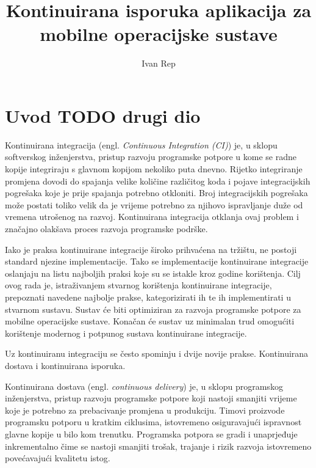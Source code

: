 \documentclass[times, utf8, seminar, numeric]{fer}
\newcommand{\eng}[1]{(engl. \textit{#1})}
\begin{document}
\nocite{*}

\title{Kontinuirana isporuka aplikacija za mobilne operacijske sustave}

\author{Ivan Rep}


\maketitle

\tableofcontents

\chapter{Uvod TODO drugi dio}
Kontinuirana integracija \eng{Continuous Integration (CI)} je, u sklopu softverskog inženjerstva, pristup razvoju programske potpore u kome se radne kopije integriraju s glavnom kopijom nekoliko puta dnevno. Rijetko integriranje promjena dovodi do spajanja velike količine različitog koda i pojave integracijskih pogrešaka koje je prije spajanja potrebno otkloniti. Broj integracijskih pogrešaka može postati toliko velik da je vrijeme potrebno za njihovo ispravljanje duže od vremena utrošenog na razvoj. Kontinuirana integracija otklanja ovaj problem i značajno olakšava proces razvoja programske podrške\citep{wiki:CI}.

Iako je praksa kontinuirane integracije široko prihvaćena na tržištu, ne postoji standard njezine implementacije. Tako se implementacije kontinuirane integracije oslanjaju na listu najboljih praksi koje su se istakle kroz godine korištenja. Cilj ovog rada je, istraživanjem stvarnog korištenja kontinuirane integracije, prepoznati navedene najbolje prakse, kategorizirati ih te ih implementirati u stvarnom sustavu. Sustav će biti optimiziran za razvoja programske potpore za mobilne operacijske sustave. Konačan će sustav uz minimalan trud omogućiti korištenje modernog i potpunog sustava kontinuirane integracije.

Uz kontinuiranu integraciju se često spominju i dvije novije prakse. Kontinuirana dostava i kontinuirana isporuka.

Kontinuirana dostava \eng{continuous delivery} je, u sklopu programskog inženjerstva, pristup razvoju programske potpore koji nastoji smanjiti vrijeme koje je potrebno za prebacivanje promjena u produkciju. Timovi proizvode programsku potporu u kratkim ciklusima, istovremeno osiguravajući ispravnost glavne kopije u bilo kom trenutku. Programska potpora se gradi i unaprjeđuje inkrementalno čime se nastoji smanjiti trošak, trajanje i rizik razvoja istovremeno povećavajući kvalitetu istog\citep{wiki:CD}.
\end{document}
